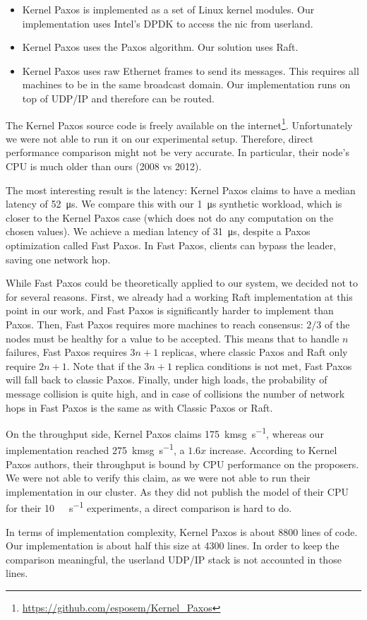 \begin{itemize}
    \item Kernel Paxos is implemented as a set of Linux kernel modules.
        Our implementation uses Intel's DPDK\cite{dpdk} to access the \gls{nic} from userland.
    \item Kernel Paxos uses the Paxos algorithm.
        Our solution uses Raft.
    \item Kernel Paxos uses raw Ethernet frames to send its messages.
        This requires all machines to be in the same broadcast domain.
        Our implementation runs on top of UDP/IP and therefore can be routed.
\end{itemize}

The Kernel Paxos source code is freely available on the internet\footnote{\url{https://github.com/esposem/Kernel_Paxos}}.
Unfortunately we were not able to run it on our experimental setup.
Therefore, direct performance comparison might not be very accurate.
In particular, their node's CPU is much older than ours (2008 vs 2012).

The most interesting result is the latency: Kernel Paxos claims to have a median latency of \SI{52}{\micro\second}.
We compare this with our \SI{1}{\micro\second} synthetic workload, which is closer to the Kernel Paxos case (which does not do any computation on the chosen values).
We achieve a median latency of \SI{31}{\micro\second}, despite a Paxos optimization called Fast Paxos\cite{lamport2006fast}.
In Fast Paxos, clients can bypass the leader, saving one network hop.

While Fast Paxos could be theoretically applied to our system, we decided not to for several reasons.
First, we already had a working Raft implementation at this point in our work, and Fast Paxos is significantly harder to implement than Paxos.
Then, Fast Paxos requires more machines to reach consensus: $2/3$ of the nodes must be healthy for a value to be accepted.
This means that to handle $n$ failures, Fast Paxos requires $3n + 1$ replicas, where classic Paxos and Raft only require $2n + 1$.
Note that if the $3n + 1$ replica conditions is not met, Fast Paxos will fall back to classic Paxos.
Finally, under high loads, the probability of message collision is quite high, and in case of collisions the number of network hops in Fast Paxos is the same as with Classic Paxos or Raft.

On the throughput side, Kernel Paxos claims \SI{175}{\kilo msg\per\second}, whereas our implementation reached \SI{275}{\kilo msg\per\second}, a $1.6x$ increase.
According to Kernel Paxos authors, their throughput is bound by CPU performance on the proposers.
We were not able to verify this claim, as we were not able to run their implementation in our cluster.
As they did not publish the model of their CPU for their \SI{10}{\giga\bit\per\second} experiments, a direct comparison is hard to do.

In terms of implementation complexity, Kernel Paxos is about 8800 lines of code.
Our implementation is about half this size at 4300 lines.
In order to keep the comparison meaningful, the userland UDP/IP stack is not accounted in those lines.
